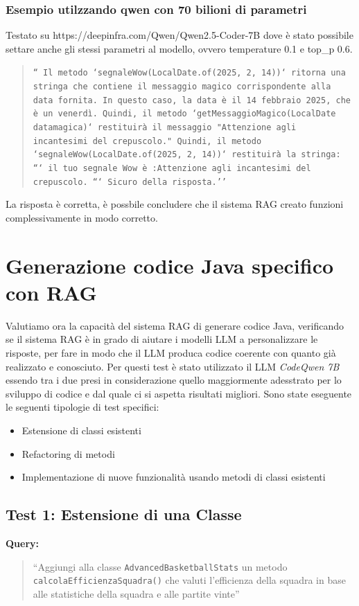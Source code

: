 \documentclass[12pt,a4paper,openright,twoside]{book}
\begin{document}
\subsubsection{Esempio utilzzando qwen con 70 bilioni di parametri}
Testato su https://deepinfra.com/Qwen/Qwen2.5-Coder-7B dove è stato possibile settare anche gli stessi parametri al modello, ovvero temperature 0.1 e top\_p 0.6.
\begin{quote}
    \texttt{`` Il metodo `segnaleWow(LocalDate.of(2025, 2, 14))` ritorna una stringa che contiene il messaggio magico corrispondente alla data fornita. In questo caso, la data è il 14 febbraio 2025, che è un venerdì. Quindi, il metodo `getMessaggioMagico(LocalDate datamagica)` restituirà il messaggio "Attenzione agli incantesimi del crepuscolo." 
    Quindi, il metodo `segnaleWow(LocalDate.of(2025, 2, 14))` restituirà la stringa:
    ```
    il tuo segnale Wow è :Attenzione agli incantesimi del crepuscolo.
    ``` 
    Sicuro della risposta.''}
\end{quote}
La risposta è corretta, è possbile concludere che il sistema RAG creato funzioni complessivamente in modo corretto.
\section{Generazione codice Java specifico con RAG}
Valutiamo ora la capacità del sistema RAG di generare codice Java, verificando se il sistema RAG è in grado di aiutare i modelli LLM a personalizzare le risposte, per fare in modo che il
LLM produca codice coerente con quanto già realizzato e conosciuto.
Per questi test è stato utilizzato il LLM \emph{CodeQwen 7B} essendo tra i due presi in considerazione quello maggiormente adesstrato per lo sviluppo di codice e dal quale ci si aspetta risultati migliori.
Sono state eseguente le seguenti tipologie di test specifici:
\begin{itemize}
    \item Estensione di classi esistenti
    \item Refactoring di metodi 
    \item Implementazione di nuove funzionalità usando metodi di classi esistenti
\end{itemize}

\subsection{Test 1: Estensione di una Classe}
\textbf{Query:} 
\begin{quote}
``Aggiungi alla classe \texttt{AdvancedBasketballStats} un metodo \texttt{calcolaEfficienzaSquadra()} 
che valuti l'efficienza della squadra in base alle statistiche della squadra e alle partite vinte''
\end{quote}
\end{document}
